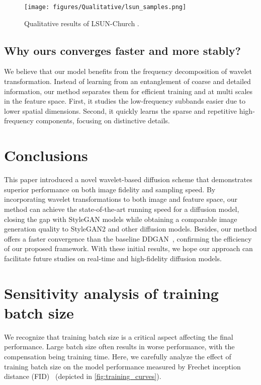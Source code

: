 \documentclass[10pt,twocolumn,letterpaper]{article}
\begin{document}
\begin{figure}[t]
  \centering
\texttt{[image: figures/Qualitative/lsun\_samples.png]}
   \vspace{-2mm}
   \caption{Qualitative results of LSUN-Church .}
   \vspace{-3mm}
   \label{fig:lsun_samples}
\end{figure}

\subsection{Why ours converges faster and more stably?}
We believe that our model benefits from the frequency decomposition of wavelet transformation. Instead of learning from an entanglement of coarse and detailed information, our method separates them for efficient training and at multi scales in the feature space. First, it studies the low-frequency subbands easier due to lower spatial dimensions. Second, it quickly learns the sparse and repetitive high-frequency components, focusing on distinctive details.

\section{Conclusions} \label{sec:conclusion}
This paper introduced a novel wavelet-based diffusion scheme that demonstrates superior performance on both image fidelity and sampling speed. By incorporating wavelet transformations to both image and feature space, our method can achieve the state-of-the-art running speed for a diffusion model, closing the gap with StyleGAN models\cite{karras2019style,karras2020training,zhao2020differentiable} while obtaining a comparable image generation quality to StyleGAN2 and other diffusion models. Besides, our method offers a faster convergence than the baseline DDGAN~\cite{xiao2021tackling}, confirming the efficiency of our proposed framework. With these initial results, we hope our approach can facilitate future studies on real-time and high-fidelity diffusion models.

{\small


}

\newpage
\appendix
\section{Sensitivity analysis of training batch size}\label{apsec:sensitivity}


We recognize that training batch size is a critical aspect affecting the final performance. Large batch size often results in worse performance, with the compensation being training time. Here, we carefully analyze the effect of training batch size on the model performance measured by Frechet inception distance (FID)~\cite{heusel2017gans} (depicted in \cref{fig:training_curves}).
\end{document}

